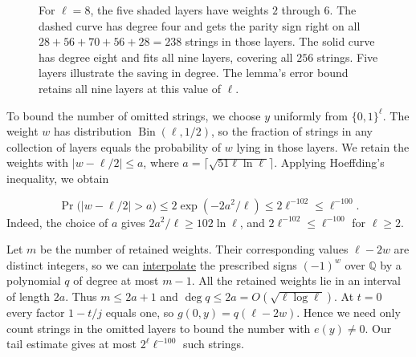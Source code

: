 \documentclass{article}
\theoremstyle{definition}
\begin{document}
\begin{figure}[htbp]
{}
\caption{For \(\ell=8\), the five shaded layers have weights \(2\) through
\(6\). The dashed curve has degree four and gets the parity sign right on
all \(28+56+70+56+28=238\) strings in those layers. The solid curve has
degree eight and fits all nine layers, covering all \(256\) strings.
Five layers illustrate the saving in degree. The lemma's error bound
retains all nine layers at this value of \(\ell\).}
\label{fig:parity-layers}
\end{figure}

To bound the number of omitted strings, we choose \(y\) uniformly from
\(\{0,1\}^\ell\). The weight \(w\) has distribution
\(\operatorname{Bin}(\ell,1/2)\), so the fraction of strings in any
collection of layers equals the probability of \(w\) lying in those
layers. We retain the weights with \(|w-\ell/2|\le a\), where
\(a=\lceil\sqrt{51\ell\ln\ell}\rceil\). Applying Hoeffding's inequality, we obtain

\[
    \Pr\bigl(|w-\ell/2|>a\bigr)
    \le 2\exp(-2a^2/\ell)
    \le 2\ell^{-102}
    \le \ell^{-100}.
\]
Indeed, the choice of \(a\) gives \(2a^2/\ell\ge 102\ln\ell\), and
\(2\ell^{-102}\le\ell^{-100}\) for \(\ell\ge2\).

Let \(m\) be the number of retained weights. Their corresponding
values \(\ell-2w\) are distinct integers, so we can
\hyperref[alg:vandermonde]{interpolate} the prescribed signs
\((-1)^w\) over \(\mathbb Q\) by a polynomial \(q\) of degree at most
\(m-1\). All the retained weights lie in an interval of length \(2a\).
Thus \(m\le2a+1\) and \(\deg q\le 2a=O(\sqrt{\ell\log\ell})\).
At \(t=0\) every factor \(1-t/j\) equals one, so \(g(0,y)=q(\ell-2w)\).
Hence we need only count strings in the omitted layers to bound the
number with \(e(y)\ne0\). Our tail estimate gives at most
\(2^\ell\ell^{-100}\) such strings.
\end{document}
